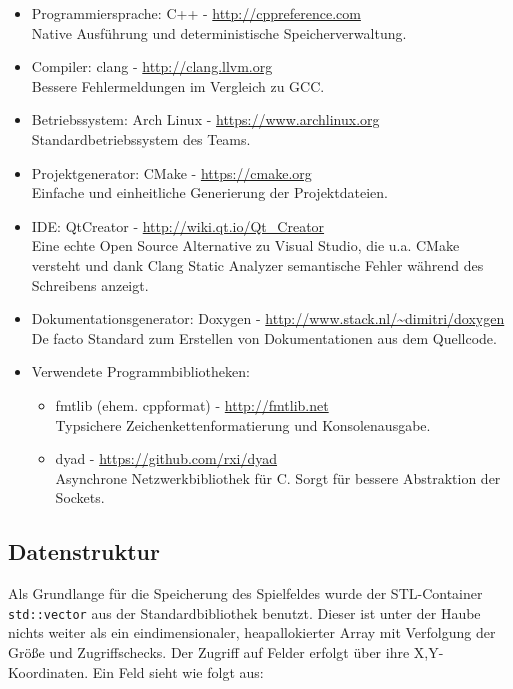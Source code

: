 \documentclass[12pt,a4paper]{article}
\begin{document}
\begin{itemize}
\item Programmiersprache: C++ - \url{http://cppreference.com} \\
Native Ausführung und deterministische Speicherverwaltung.
\item Compiler: clang - \url{http://clang.llvm.org} \\
Bessere Fehlermeldungen im Vergleich zu GCC.
\item Betriebssystem: Arch Linux - \url{https://www.archlinux.org} \\
Standardbetriebssystem des Teams.
\item Projektgenerator: CMake - \url{https://cmake.org} \\
Einfache und einheitliche Generierung der Projektdateien.
\item IDE: QtCreator - \url{http://wiki.qt.io/Qt_Creator} \\
Eine echte Open Source Alternative zu Visual Studio, die u.a. CMake versteht und dank Clang Static Analyzer semantische Fehler während des Schreibens anzeigt.
\item Dokumentationsgenerator: Doxygen - \url{http://www.stack.nl/~dimitri/doxygen} \\
De facto Standard zum Erstellen von Dokumentationen aus dem Quellcode.

\item Verwendete Programmbibliotheken:
\begin{itemize}
\item fmtlib (ehem. cppformat) - \url{http://fmtlib.net} \\
Typsichere Zeichenkettenformatierung und Konsolenausgabe.
\item dyad - \url{https://github.com/rxi/dyad} \\
Asynchrone Netzwerkbibliothek für C. Sorgt für bessere Abstraktion der Sockets.
\end{itemize}

\end{itemize}

\subsection{Datenstruktur}
Als Grundlange für die Speicherung des Spielfeldes wurde der STL-Container \texttt{std::vector} aus der Standardbibliothek benutzt. Dieser ist unter der Haube nichts weiter als ein eindimensionaler, heapallokierter Array mit Verfolgung der Größe und Zugriffschecks. Der Zugriff auf Felder erfolgt über ihre X,Y-Koordinaten.
Ein Feld sieht wie folgt aus:
\end{document}
